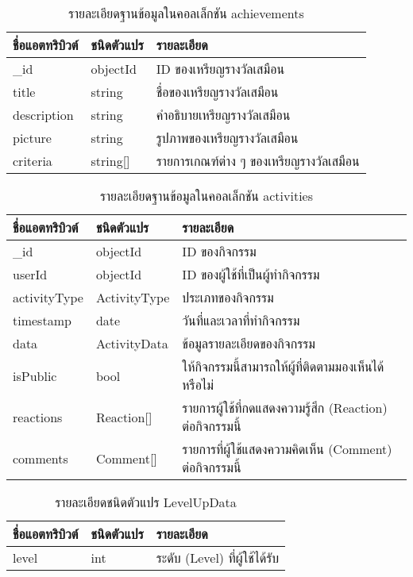 \begin{table}
    \caption{รายละเอียดฐานข้อมูลในคอลเล็กชัน achievements}
    \begin{tabularx}{\textwidth}{ | l | l | X | }
        \hline
        \bf ชื่อแอตทริบิวต์ & \bf ชนิดตัวแปร & \bf รายละเอียด \\\hline
        \_id & objectId & ID ของเหรียญรางวัลเสมือน\\\hline
        title & string & ชื่อของเหรียญรางวัลเสมือน\\\hline
        description & string & คำอธิบายเหรียญรางวัลเสมือน\\\hline
        picture & string & รูปภาพของเหรียญรางวัลเสมือน\\\hline
        criteria & string[] & รายการเกณฑ์ต่าง ๆ ของเหรียญรางวัลเสมือน\\\hline
    \end{tabularx}
\end{table}

\begin{table}
    \caption{รายละเอียดฐานข้อมูลในคอลเล็กชัน activities}
    \begin{tabularx}{\textwidth}{ | l | l | X | }
        \hline
        \bf ชื่อแอตทริบิวต์ & \bf ชนิดตัวแปร & \bf รายละเอียด \\\hline
        \_id & objectId & ID ของกิจกรรม\\\hline
        userId & objectId & ID ของผู้ใช้ที่เป็นผู้ทำกิจกรรม\\\hline
        activityType & ActivityType & ประเภทของกิจกรรม\\\hline
        timestamp & date & วันที่และเวลาที่ทำกิจกรรม\\\hline
        data & ActivityData & ข้อมูลรายละเอียดของกิจกรรม\\\hline
        isPublic & bool & ให้กิจกรรมนี้สามารถให้ผู้ที่ติดตามมองเห็นได้หรือไม่\\\hline
        reactions & Reaction[] & รายการผู้ใช้ที่กดแสดงความรู้สึก (Reaction) ต่อกิจกรรมนี้\\\hline
        comments & Comment[] & รายการที่ผู้ใช้แสดงความคิดเห็น (Comment) ต่อกิจกรรมนี้\\\hline
    \end{tabularx}
\end{table}

\begin{table}
    \caption{รายละเอียดชนิดตัวแปร LevelUpData}
    \begin{tabularx}{\textwidth}{ | l | l | X | }
        \hline
        \bf ชื่อแอตทริบิวต์ & \bf ชนิดตัวแปร & \bf รายละเอียด \\\hline
        level & int & ระดับ (Level) ที่ผู้ใช้ได้รับ\\\hline
    \end{tabularx}
\end{table}

